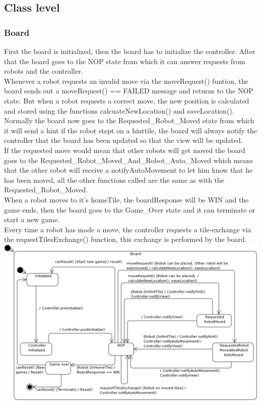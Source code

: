 \subsection{Class level}
	\subsubsection{Board}
	First the board is initialized, then the board has to initialize the controller. After that the board goes to the NOP state from which it can answer requests from robots and the controller. \\
Whenever a robot requests an invalid move via the moveRequest() funtion, the board sends out a moveRequest() == FAILED message and returns to the NOP state. But when a robot requests a correct move, the new position is calculated and stored using the functions calcuateNewLocation() and saveLocation(). \\
Normally the board now goes to the Requested\_Robot\_Moved state from which it will send a hint if the robot stept on a hinttile, the board will always notify the controller that the board has been updated so that the view will be updated.\\
If the requested move would mean that other robots will get moved the board goes to the Requested\_Robot\_Moved\_And\_Robot\_Auto\_Moved which means that the other robot will receive a notifyAutoMovement to let him know that he has been moved, all the other functions called are the same as with the Requested\_Robot\_Moved.\\
When a robot moves to it's homeTile, the boardResponse will be WIN and the game ends, then the board goes to the Game\_Over state and it can terminate or start a new game.\\
Every time a robot has made a move, the controller requests a tile-exchange via the requestTilesExchange() function, this exchange is performed by the board.\\
	
	\includegraphics[width=\linewidth]{statecharts/board.pdf}


